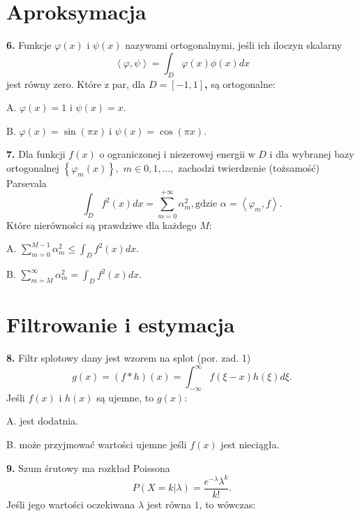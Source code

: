 \documentclass[journal,9pt,final,a4paper]{IEEEtran}%
\begin{document}
\section{Aproksymacja}

\textbf{6. }Funkcje $\varphi\left(  x\right)  $ i $\psi\left(  x\right)  $
nazywami ortogonalnymi, je\'{s}li ich iloczyn skalarny%
\[
\left\langle \varphi,\psi\right\rangle =\int_{D}\varphi\left(  x\right)
\phi\left(  x\right)  dx
\]
jest r\'{o}wny zero. Kt\'{o}re z par, dla $D=\left[  -1,1\right]  $\textbf{,}
s\k{a} ortogonalne:

A. $\varphi\left(  x\right)  =1$ i $\psi\left(  x\right)  =x.$

B. $\varphi\left(  x\right)  =\sin\left(  \pi x\right)  \mathbf{\ }$i
$\psi\left(  x\right)  =\cos\left(  \pi x\right)  .$

\vspace*{0.25in}\textbf{7. }Dla funkcji $f\left(  x\right)  $ o ograniczonej i
niezerowej energii w $D$ i dla wybranej bazy ortogonalnej $\left\{
\varphi_{m}\left(  x\right)  \right\}  ,$ $m\in0,1,\ldots\mathbf{,}$ zachodzi
twierdzenie (to\.{z}samo\'{s}\'{c}) Parsevala%
\[
\int_{D}f^{2}\left(  x\right)  dx=\sum_{m=0}^{+\infty}\alpha_{m}^{2},\text{
gdzie }\alpha=\left\langle \varphi_{m},f\right\rangle .
\]
Kt\'{o}re nier\'{o}wno\'{s}ci s\k{a} prawdziwe dla ka\.{z}dego $M$:

A. $\sum_{m=0}^{M-1}\alpha_{m}^{2}\leq\int_{D}f^{2}\left(  x\right)  dx.$

B. $\sum_{m=M}^{\infty}\alpha_{m}^{2}=\int_{D}f^{2}\left(  x\right)  dx.$

\section{Filtrowanie i estymacja}

\textbf{8. }Filtr splotowy dany jest wzorem na splot (por. zad. 1)
\[
g\left(  x\right)  =\left(  f\ast h\right)  \left(  x\right)  =\int_{-\infty
}^{\infty}f\left(  \xi-x\right)  h\left(  \xi\right)  d\xi.
\]
Je\'{s}li $f\left(  x\right)  $ i $h\left(  x\right)  $ s\k{a} ujemne, to
$g\left(  x\right)  $:

A. jest dodatnia.

B. mo\.{z}e przyjmowa\'{c} warto\'{s}ci ujemne je\'{s}li $f\left(  x\right)  $
jest nieci\k{a}g\l a.

\vspace*{0.25in}\textbf{9. }Szum \'{s}rutowy ma rozk\l ad Poissona%
\[
P\left(  X=k\left\vert \lambda\right.  \right)  =\frac{e^{-\lambda}\lambda
^{k}}{k!}.
\]
Je\'{s}li jego warto\'{s}ci oczekiwana $\lambda$ jest r\'{o}wna $1$, to w\'{o}wczas:
\end{document}
